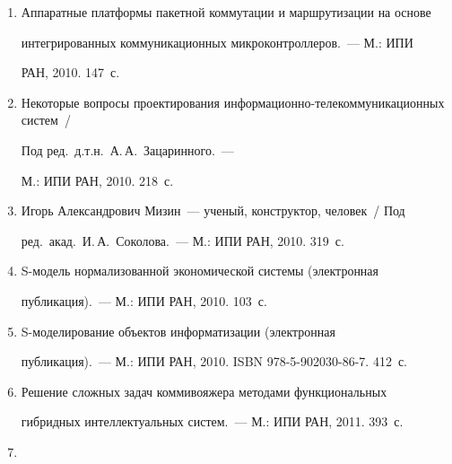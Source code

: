 \begin{enumerate}[1.]


\item {}


Аппаратные платформы пакетной коммутации и маршрутизации на основе 


интегрированных коммуникационных микроконтроллеров.~--- М.: ИПИ 


РАН, 2010. 147~с.


\item {}


Некоторые вопросы проектирования информационно-телекоммуникационных систем~/ 


Под ред.\ д.т.н.\ А.\,А.~Зацаринного.~--- 


М.: ИПИ РАН, 2010.  218~с.


\item Игорь Александрович Мизин~--- ученый, конструктор, человек~/ Под 


ред.\ акад.\ И.\,А.~Соколова.~--- М.: ИПИ РАН, 2010.  319~с.


\item {}


S-модель нормализованной экономической системы (электронная 


публикация).~--- М.: ИПИ РАН, 2010. 103~с.


\item {}


S-моделирование объектов информатизации (электронная 


публикация).~--- М.: ИПИ РАН, 2010. ISBN 978-5-902030-86-7.  412~с.


\item {}


Решение сложных задач коммивояжера методами функциональных 


гибридных интеллектуальных систем.~--- М.: ИПИ РАН, 2011.  393~с.


\item {}



\end{enumerate}
